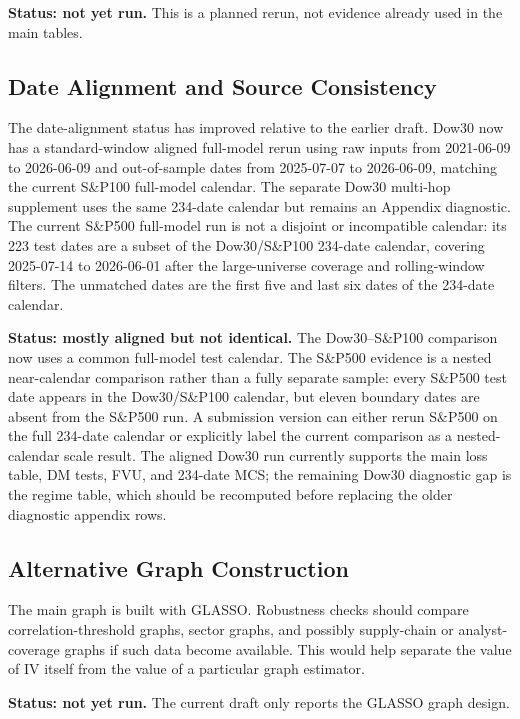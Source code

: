 \documentclass[11pt,a4paper]{article}
\begin{document}
\textbf{Status: not yet run.}  This is a planned rerun, not evidence already used in the main tables.

\subsection{Date Alignment and Source Consistency}
\label{subsec:date-robust}

The date-alignment status has improved relative to the earlier draft.  Dow30 now has a standard-window aligned full-model rerun using raw inputs from 2021-06-09 to 2026-06-09 and out-of-sample dates from 2025-07-07 to 2026-06-09, matching the current S\&P100 full-model calendar.  The separate Dow30 multi-hop supplement uses the same 234-date calendar but remains an Appendix diagnostic.  The current S\&P500 full-model run is not a disjoint or incompatible calendar: its 223 test dates are a subset of the Dow30/S\&P100 234-date calendar, covering 2025-07-14 to 2026-06-01 after the large-universe coverage and rolling-window filters.  The unmatched dates are the first five and last six dates of the 234-date calendar.

\textbf{Status: mostly aligned but not identical.}  The Dow30--S\&P100 comparison now uses a common full-model test calendar.  The S\&P500 evidence is a nested near-calendar comparison rather than a fully separate sample: every S\&P500 test date appears in the Dow30/S\&P100 calendar, but eleven boundary dates are absent from the S\&P500 run.  A submission version can either rerun S\&P500 on the full 234-date calendar or explicitly label the current comparison as a nested-calendar scale result.  The aligned Dow30 run currently supports the main loss table, DM tests, FVU, and 234-date MCS; the remaining Dow30 diagnostic gap is the regime table, which should be recomputed before replacing the older diagnostic appendix rows.

\subsection{Alternative Graph Construction}
\label{subsec:graph-robust}

The main graph is built with GLASSO.  Robustness checks should compare correlation-threshold graphs, sector graphs, and possibly supply-chain or analyst-coverage graphs if such data become available.  This would help separate the value of IV itself from the value of a particular graph estimator.

\textbf{Status: not yet run.}  The current draft only reports the GLASSO graph design.
\end{document}
